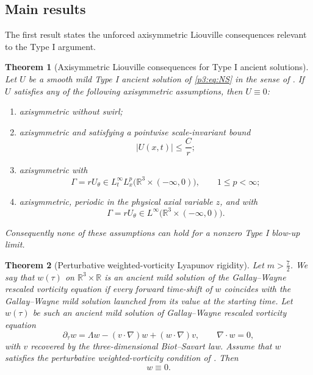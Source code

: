 \documentclass[11pt]{amsart}
\theoremstyle{plain}
\newtheorem{theorem}{Theorem}[section]
\theoremstyle{definition}
\theoremstyle{remark}
\numberwithin{equation}{section}
\begin{document}
\subsection{Main results}

The first result states the unforced axisymmetric Liouville consequences
relevant to the Type I argument.

\begin{theorem}[Axisymmetric Liouville consequences for Type I ancient solutions]
\label{p3:thm:axisymmetric-liouville}
Let \(U\) be a smooth mild Type I ancient solution of \eqref{p3:eq:NS}
in the sense of .  If \(U\) satisfies any of the following axisymmetric
assumptions, then \(U\equiv0\):
\begin{enumerate}[label=\textup{(\roman*)}]
\item axisymmetric without swirl;
\item axisymmetric and satisfying a pointwise scale-invariant bound
\[
   |U(x,t)|\le \frac{C}{r};
\]
\item axisymmetric with
\[
   \Gamma=rU_\theta\in L_t^\infty L_x^p
   \bigl(\mathbb R^3\times(-\infty,0)\bigr),
   \qquad 1\le p<\infty;
\]
\item axisymmetric, periodic in the physical axial variable \(z\), and with
\[
   \Gamma=rU_\theta\in L^\infty
   \bigl(\mathbb R^3\times(-\infty,0)\bigr).
\]
\end{enumerate}
Consequently none of these assumptions can hold for a nonzero Type I blow-up
limit.
\end{theorem}

\begin{theorem}[Perturbative weighted-vorticity Lyapunov rigidity]
\label{p3:thm:weighted-vorticity-vanishing-intro}
Let \(m>\frac72\).  We say that \(w(\tau)\) on \(\mathbb R^3\times\mathbb R\)
is an \emph{ancient mild solution} of the Gallay--Wayne rescaled vorticity
equation if every forward time-shift of \(w\) coincides with the
Gallay--Wayne mild solution launched from its value at the starting time.
Let \(w(\tau)\) be such an ancient mild solution of
Gallay--Wayne rescaled vorticity equation
\begin{equation}\label{p3:eq:weighted-vorticity-intro}
   \partial_\tau w
   =
   \Lambda w-(v\cdot\nabla)w+(w\cdot\nabla)v,
   \qquad \nabla\cdot w=0,
\end{equation}
with \(v\) recovered by the three-dimensional Biot--Savart law.  Assume
that \(w\) satisfies the perturbative weighted-vorticity condition of
.  Then
\[
   w\equiv0.
\]
\end{theorem}
\end{document}
